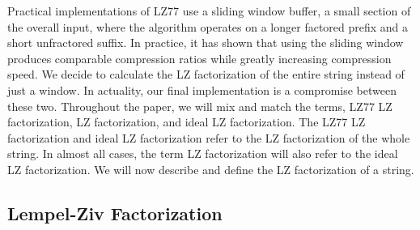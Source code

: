 Practical implementations of LZ77 use a sliding window buffer, a small section of the overall input, where the algorithm operates on a longer factored prefix and a short unfractored suffix.
In practice, it has shown that using the sliding window produces comparable compression ratios while greatly increasing compression speed.
We decide to calculate the LZ factorization of the entire string instead of just a window.
In actuality, our final implementation is a compromise between these two.
Throughout the paper, we will mix and match the terms, LZ77 LZ factorization, LZ factorization, and ideal LZ factorization.
The LZ77 LZ factorization and ideal LZ factorization refer to the LZ factorization of the whole string.
In almost all cases, the term LZ factorization will also refer to the ideal LZ factorization.
We will now describe and define the LZ factorization of a string.

\subsection{Lempel-Ziv Factorization}


